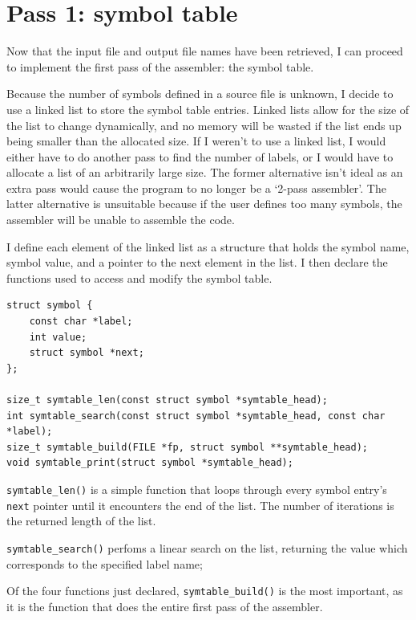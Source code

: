\documentclass[a4paper]{report}
\begin{document}
\section{Pass 1: symbol table}

Now that the input file and output file names have been retrieved, I can proceed
to implement the first pass of the assembler: the symbol table.

Because the number of symbols defined in a source file is unknown, I decide to
use a linked list to store the symbol table entries. Linked lists allow for the
size of the list to change dynamically, and no memory will be wasted if the
list ends up being smaller than the allocated size. If I weren't to use a linked
list, I would either have to do another pass to find the number of labels, or I
would have to allocate a list of an arbitrarily large size. The former
alternative isn't ideal as an extra pass would cause the program to no longer be
a `2-pass assembler'. The latter alternative is unsuitable because if the user
defines too many symbols, the assembler will be unable to assemble the code.

I define each element of the linked list as a structure that holds the symbol
name, symbol value, and a pointer to the next element in the list. I then declare
the functions used to access and modify the symbol table.

\begin{lstlisting}
struct symbol {
	const char *label;
	int value;
	struct symbol *next;
};

size_t symtable_len(const struct symbol *symtable_head);
int symtable_search(const struct symbol *symtable_head, const char *label);
size_t symtable_build(FILE *fp, struct symbol **symtable_head);
void symtable_print(struct symbol *symtable_head);
\end{lstlisting}

\texttt{symtable\_len()} is a simple function that loops through every symbol
entry's \texttt{next} pointer until it encounters the end of the list. The
number of iterations is the returned length of the list.

\texttt{symtable\_search()} perfoms a linear search on the list, returning the
value which corresponds to the specified label name;

\bigbreak

Of the four functions just declared, \texttt{symtable\_build()} is the most
important, as it is the function that does the entire first pass of the
assembler.
\end{document}

